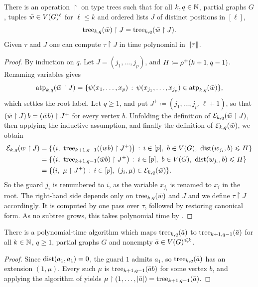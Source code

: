 \begin{lemma}\label{lem:restrict}
There is an operation $\restriction$ on type trees
such that for all \(k,q\in\mathbb N\), partial graphs \(G\),
tuples $\bar w\in V(G)^{\ell}$ for $\ell\le k$ and ordered lists $J$ of distinct positions in $[\ell]$,
\[
\mathrm{tree}_{k,q}(\bar w)\restriction J
=
\mathrm{tree}_{k,q}(\bar w\restriction J).
\]
Given $\tau$ and $J$ one can compute $\tau\restriction J$ in time polynomial in $\lVert \tau\rVert$.
\end{lemma}
\begin{proof}
By induction on $q$.
Let $J=(j_1,\ldots,j_p)$, and $H\coloneqq\rho^+(k+1,q-1)$.
Renaming variables gives
\[
\textnormal{atp}_{k,q}(\bar w\restriction J)=\{\psi(x_1,\ldots,x_p) \,:\, \psi(x_{j_1},\ldots,x_{j_p})\in\textnormal{atp}_{k,q}(\bar w) \},
\]
which settles the root label.
Let $q\ge1$, and put $J^+\coloneqq(j_1,\ldots,j_p,\ell+1)$, so that $(\bar w\restriction J)\,b=(\bar w b)\restriction J^+$ for every vertex $b$.
Unfolding the definition of $\mathcal E_{k,q}(\bar w\restriction J)$, then applying the inductive assumption, and finally the definition of $\mathcal E_{k,q}(\bar w)$, we obtain
\begin{align*}
\mathcal E_{k,q}(\bar w\restriction J)
&=\{\bigl(i,\ \mathrm{tree}_{k+1,q-1}((\bar w b)\restriction J^+)\bigr) \,:\, i\in[p],\ b\in V(G),\ \mathrm{dist}(w_{j_i},b)\leqslant H \}\\
&=\{\bigl(i,\ \mathrm{tree}_{k+1,q-1}(\bar w b)\restriction J^+\bigr) \,:\, i\in[p],\ b\in V(G),\ \mathrm{dist}(w_{j_i},b)\leqslant H \}\\
&=\{(i,\ \mu\restriction J^+) \,:\, i\in[p],\ (j_i,\mu)\in\mathcal E_{k,q}(\bar w) \}.
\end{align*}
So the guard $j_i$ is renumbered to $i$, as the variable $x_{j_i}$ is renamed to $x_i$ in the root.
The right-hand side depends only on $\mathrm{tree}_{k,q}(\bar w)$ and $J$ and we define $\tau\restriction J$ accordingly.
It is computed by one pass over $\tau$, followed by restoring canonical form. As no subtree grows, this takes polynomial time by .
\end{proof}

\begin{lemma}\label{lem:shift}
There is a polynomial-time algorithm which maps
$\mathrm{tree}_{k,q}(\bar a)$ to $\mathrm{tree}_{k+1,q-1}(\bar a)$ for all \(k\in\mathbb N\), \(q\ge1\),
partial graphs \(G\) and nonempty $\bar a\in V(G)^{\leqslant k}$.
\end{lemma}
\begin{proof}
Since $\mathrm{dist}(a_1,a_1)=0$, the guard $1$ admits $a_1$, so $\mathrm{tree}_{k,q}(\bar a)$ has an extension $(1,\mu)$.
Every such $\mu$ is $\mathrm{tree}_{k+1,q-1}(\bar ab)$ for some vertex $b$, and applying the algorithm of  yields
$\mu\restriction(1,\ldots,|\bar a|)=\mathrm{tree}_{k+1,q-1}(\bar a)$.
\end{proof}

